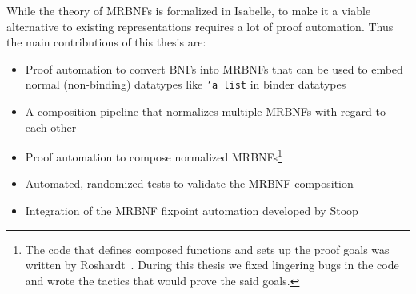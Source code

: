 While the theory of \acp{MRBNF} is formalized in Isabelle, to make it a viable alternative to existing representations requires a lot of proof automation. Thus the main contributions of this thesis are:

\begin{itemize}
\item{Proof automation to convert \acp{BNF} into \acp{MRBNF} that can be used to embed normal (non-binding) datatypes like \texttt{'a list} in binder datatypes}
\item{A composition pipeline that normalizes multiple \acp{MRBNF} with regard to each other}
\item{Proof automation to compose normalized \acp{MRBNF}\footnote{The code that defines composed functions and sets up the proof goals was written by Roshardt~\cite{mrbnf_composition}. During this thesis we fixed lingering bugs in the code and wrote the tactics that would prove the said goals.}}
\item{Automated, randomized tests to validate the \ac{MRBNF} composition}
\item{Integration of the \ac{MRBNF} fixpoint automation developed by Stoop~\cite{mrbnf_fixpoint}}
\end{itemize}
